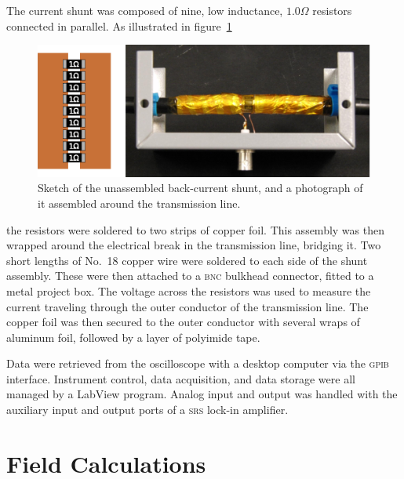 The current shunt was composed of nine, low inductance, $1.0 \Omega$ resistors
connected in parallel. As illustrated in figure~\ref{fig:cbcs}
\begin{figure}
  \centering
  \includegraphics{./chapters/experiment/figures/cbcs.eps}
  \caption{Sketch of the unassembled back-current shunt, and a photograph of it
  assembled around the transmission line.}
  \label{fig:cbcs}
\end{figure}
the resistors were soldered to two strips of copper foil. This assembly was then
wrapped around the electrical break in the transmission line, bridging it. Two
short lengths of No.\ 18 copper wire were soldered to each side of the shunt
assembly. These were then attached to a \textsc{bnc} bulkhead connector, fitted
to a metal project box. The voltage across the resistors was used to measure the
current traveling through the outer conductor of the transmission line. The
copper foil was then secured to the outer conductor with several wraps of
aluminum foil, followed by a layer of polyimide tape.

Data were retrieved from the oscilloscope with a desktop computer via the
\textsc{gpib} interface. Instrument control, data acquisition, and data storage
were all managed by a LabView program. Analog input and output was handled with
the auxiliary input and output ports of a \textsc{srs} 
lock-in amplifier.

\section{Field Calculations}

